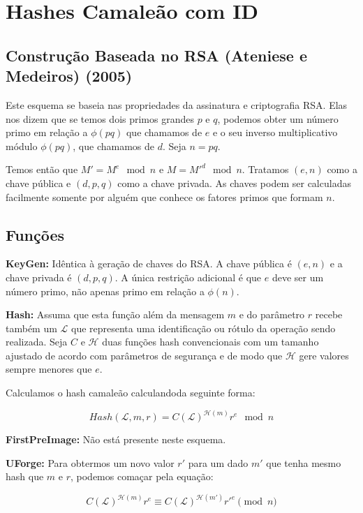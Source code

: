 \documentclass[a4paper]{article}
\begin{document}
\section{Hashes Camaleão com ID}

\subsection{Construção Baseada no RSA (Ateniese e Medeiros) (2005)\cite{ateniese}}

Este esquema se baseia nas propriedades da assinatura e criptografia
RSA. Elas nos dizem que se temos dois primos grandes $p$ e $q$,
podemos obter um número primo em relação a $\phi(pq)$ que chamamos de
$e$ e o seu inverso multiplicativo módulo $\phi(pq)$, que chamamos de
$d$. Seja $n=pq$.

Temos então que $M'=M^e \mod n$ e $M=M'^d \mod n$. Tratamos $(e, n)$
como a chave pública e $(d, p, q)$ como a chave privada. As chaves
podem ser calculadas facilmente somente por alguém que conhece os
fatores primos que formam $n$.

\subsection{Funções}

\textbf{KeyGen: } Idêntica à geração de chaves do RSA. A chave pública
é $(e, n)$ e a chave privada é $(d, p, q)$. A única restrição
adicional é que $e$ deve ser um número primo, não apenas primo em
relação a $\phi(n)$.

\textbf{Hash: } Assuma que esta função além da mensagem $m$ e do
parâmetro $r$ recebe também um $\mathcal{L}$ que representa uma
identificação ou rótulo da operação sendo realizada. Seja $C$ e
$\mathcal{H}$ duas funções hash convencionais com um tamanho ajustado
de acordo com parâmetros de segurança e de modo que $\mathcal{H}$ gere
valores sempre menores que $e$.

Calculamos o hash camaleão calculandoda seguinte forma:

$$
Hash(\mathcal{L}, m, r) = C(\mathcal{L})^{\mathcal{H}(m)}r^e \mod n
$$

\textbf{FirstPreImage:} Não está presente neste esquema.

\textbf{UForge:} Para obtermos um novo valor $r'$ para um dado $m'$
que tenha mesmo hash que $m$ e $r$, podemos comaçar pela equação:

$$
C(\mathcal{L})^{\mathcal{H}(m)}r^e \equiv C(\mathcal{L})^{\mathcal{H}(m')}r'^e \pmod n
$$
\end{document}
